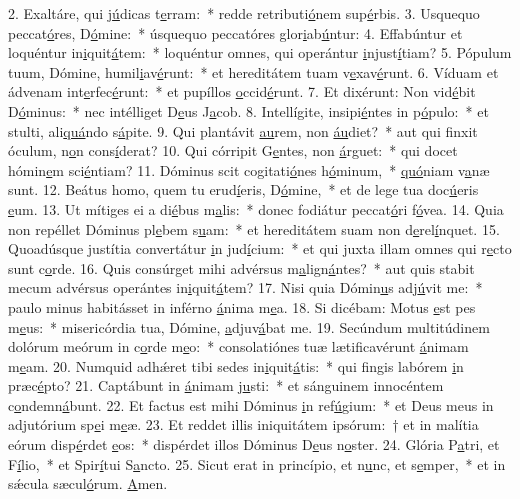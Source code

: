 2. Exaltáre, qui j\uline{ú}dicas t\uline{e}rram:~* redde retributi\uline{ó}nem sup\uline{é}rbis.
3. Usquequo peccat\uline{ó}res, D\uline{ó}mine:~* úsquequo peccatóres glor\uline{i}ab\uline{ú}ntur:
4. Effabúntur et loquéntur in\uline{i}quit\uline{á}tem:~* loquéntur omnes, qui operántur \uline{i}njust\uline{í}tiam?
5. Pópulum tuum, Dómine, humil\uline{i}av\uline{é}runt:~* et hereditátem tuam v\uline{e}xav\uline{é}runt.
6. Víduam et ádvenam int\uline{e}rfec\uline{é}runt:~* et pupíllos \uline{o}ccid\uline{é}runt.
7. Et dixérunt: Non vid\uline{é}bit D\uline{ó}minus:~* nec intélliget D\uline{e}us J\uline{a}cob.
8. Intellígite, insipi\uline{é}ntes in p\uline{ó}pulo:~* et stulti, ali\uline{quá}ndo s\uline{á}pite.
9. Qui plantávit \uline{au}rem, non \uline{áu}diet?~* aut qui finxit óculum, n\uline{o}n cons\uline{í}derat?
10. Qui córripit G\uline{e}ntes, non \uline{á}rguet:~* qui docet hómin\uline{e}m sci\uline{é}ntiam?
11. Dóminus scit cogitati\uline{ó}nes h\uline{ó}minum,~* \uline{quó}niam v\uline{a}næ sunt.
12. Beátus homo, quem tu erud\uline{í}eris, D\uline{ó}mine,~* et de lege tua doc\uline{ú}eris \uline{e}um.
13. Ut mítiges ei a di\uline{é}bus m\uline{a}lis:~* donec fodiátur peccat\uline{ó}ri f\uline{ó}vea.
14. Quia non repéllet Dóminus pl\uline{e}bem s\uline{u}am:~* et hereditátem suam non d\uline{e}rel\uline{í}nquet.
15. Quoadúsque justítia convertátur \uline{i}n jud\uline{í}cium:~* et qui juxta illam omnes qui r\uline{e}cto sunt c\uline{o}rde.
16. Quis consúrget mihi advérsus m\uline{a}lign\uline{á}ntes?~* aut quis stabit mecum advérsus operántes in\uline{i}quit\uline{á}tem?
17. Nisi quia Dómin\uline{u}s adj\uline{ú}vit me:~* paulo minus habitásset in inférno \uline{á}nima m\uline{e}a.
18. Si dicébam: Motus \uline{e}st pes m\uline{e}us:~* misericórdia tua, Dómine, \uline{a}djuv\uline{á}bat me.
19. Secúndum multitúdinem dolórum meórum in c\uline{o}rde m\uline{e}o:~* consolatiónes tuæ lætificavérunt \uline{á}nimam m\uline{e}am.
20. Numquid adhǽret tibi sedes in\uline{i}quit\uline{á}tis:~* qui fingis labórem \uline{i}n præc\uline{é}pto?
21. Captábunt in \uline{á}nimam j\uline{u}sti:~* et sánguinem innocéntem c\uline{o}ndemn\uline{á}bunt.
22. Et factus est mihi Dóminus \uline{i}n ref\uline{ú}gium:~* et Deus meus in adjutórium sp\uline{e}i m\uline{e}æ.
23. Et reddet illis iniquitátem ipsórum:~† et in malítia eórum disp\uline{é}rdet \uline{e}os:~* dispérdet illos Dóminus D\uline{e}us n\uline{o}ster.
24. Glória P\uline{a}tri, et F\uline{í}lio,~* et Spir\uline{í}tui S\uline{a}ncto.
25. Sicut erat in princípio, et n\uline{u}nc, et s\uline{e}mper,~* et in sǽcula sæcul\uline{ó}rum. \uline{A}men.
